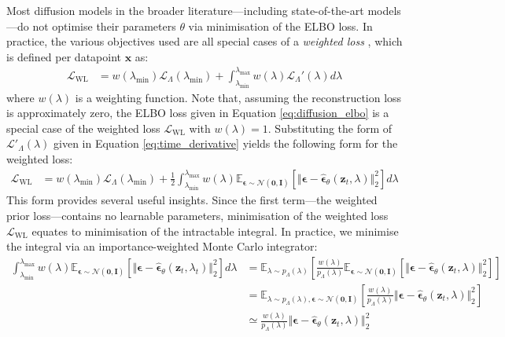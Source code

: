 \documentclass[ oneside,%
                    author={George Herbert},
                    degree={MSci},
                     title={Video Diffusion Models for Climate Simulations},
                  subtitle={}]{dissertation}
\begin{document}
Most diffusion models in the broader literature---including state-of-the-art models---do not optimise their parameters $\theta$ via minimisation of the ELBO loss. In practice, the various objectives used are all special cases of a \textit{weighted loss} \cite{Understanding_Diffusion_Objective_Kingma}, which is defined per datapoint $\mathbf{x}$ as:
\begin{align}
      \mathcal{L}_{\mathrm{WL}}&=w(\lambda_{\min})\mathcal{L}_\Lambda(\lambda_{\min})+\int_{\lambda_{\min}}^{\lambda_{\max}}w(\lambda)\mathcal{L}_\Lambda'(\lambda)d\lambda\label{eq:weighted_loss}
\end{align}
where $w(\lambda)$ is a weighting function. Note that, assuming the reconstruction loss is approximately zero, the ELBO loss given in Equation \ref{eq:diffusion_elbo} is a special case of the weighted loss $\mathcal{L}_{\mathrm{WL}}$ with $w(\lambda) = 1$. Substituting the form of $\mathcal{L}'_\Lambda(\lambda)$ given in Equation \ref{eq:time_derivative} yields the following form for the weighted loss:
\begin{align}
      \mathcal{L}_{\mathrm{WL}}&=w(\lambda_{\min})\mathcal{L}_\Lambda(\lambda_{\min})+\frac{1}{2}\int_{\lambda_{\min}}^{\lambda_{\max}}w(\lambda)\mathbb{E}_{\boldsymbol\epsilon\sim\mathcal{N}(\mathbf{0},\mathbf{I})}\left[\Vert\boldsymbol\epsilon-\hat{\boldsymbol\epsilon}_\theta(\mathbf{z}_t,\lambda)\Vert_2^2\right]d\lambda
\end{align}
This form provides several useful insights. Since the first term---the weighted prior loss---contains no learnable parameters, minimisation of the weighted loss $\mathcal{L}_{\mathrm{WL}}$ equates to minimisation of the intractable integral. In practice, we minimise the integral via an importance-weighted Monte Carlo integrator:
\begin{align}
      \int_{\lambda_{\min}}^{\lambda_{\max}}w(\lambda)\mathbb{E}_{\boldsymbol\epsilon\sim\mathcal{N}(\mathbf{0},\mathbf{I})}\left[\Vert\boldsymbol\epsilon-\hat{\boldsymbol\epsilon}_\theta(\mathbf{z}_t,\lambda_t)\Vert_2^2\right]d\lambda&=\mathbb{E}_{\lambda\sim p_\Lambda(\lambda)}\left[\frac{w(\lambda)}{p_\Lambda(\lambda)}\mathbb{E}_{\boldsymbol\epsilon\sim\mathcal{N}(\mathbf{0},\mathbf{I})}\left[\Vert\boldsymbol\epsilon - \hat{\boldsymbol\epsilon}_\theta(\mathbf{z}_t, \lambda)\Vert_2^2 \right]\right]\\
      &=\mathbb{E}_{\lambda\sim p_\Lambda(\lambda),\boldsymbol\epsilon\sim\mathcal{N}(\mathbf{0}, \mathbf{I})}\left[\frac{w(\lambda)}{p_\Lambda(\lambda)}\Vert \boldsymbol\epsilon-\hat{\boldsymbol\epsilon}_\theta(\mathbf{z}_t,\lambda)\Vert_2^2\right]\\
      &\simeq \frac{w(\lambda)}{p_\Lambda(\lambda)}\Vert \boldsymbol\epsilon-\hat{\boldsymbol\epsilon}_\theta(\mathbf{z}_t,\lambda)\Vert_2^2
\end{align}
\end{document}
